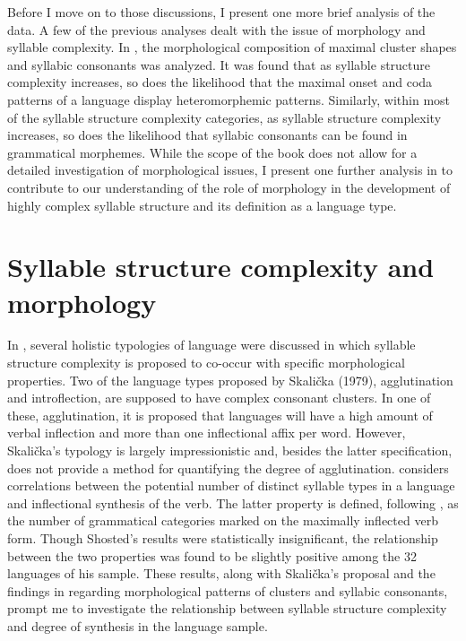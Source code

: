   Before I move on to those discussions, I present one more brief analysis of the data. A few of the previous analyses dealt with the issue of morphology and syllable complexity. In  , the morphological composition of maximal cluster shapes and syllabic consonants was analyzed. It was found that as syllable structure complexity increases, so does the likelihood that the maximal onset and coda patterns of a language display heteromorphemic patterns. Similarly, within most of the syllable structure complexity categories, as syllable structure complexity increases, so does the likelihood that syllabic consonants can be found in grammatical morphemes. While the scope of the book does not allow for a detailed investigation of morphological issues, I present one further analysis in  to contribute to our understanding of the role of morphology in the development of highly complex syllable structure and its definition as a language type.

\section{Syllable structure complexity and morphology}\label{sec:8.2}

  In , several holistic typologies of language were discussed in which syllable structure complexity is proposed to co-occur with specific morphological properties. Two of the language types proposed by Skalička (1979), agglutination and introflection, are supposed to have complex consonant clusters. In one of these, agglutination, it is proposed that languages will have a high amount of verbal inflection and more than one inflectional affix per word. However, Skalička’s typology is largely impressionistic and, besides the latter specification, does not provide a method for quantifying the degree of agglutination. \citet{Shosted2006} considers correlations between the potential number of distinct syllable types in a language and inflectional synthesis of the verb. The latter property is defined, following \citet{BickelNichols2005}, as the number of grammatical categories marked on the maximally inflected verb form. Though Shosted’s results were statistically insignificant, the relationship between the two properties was found to be slightly positive among the 32 languages of his sample. These results, along with Skalička’s proposal and the findings in  regarding morphological patterns of clusters and syllabic consonants, prompt me to investigate the relationship between syllable structure complexity and degree of synthesis in the language sample.

